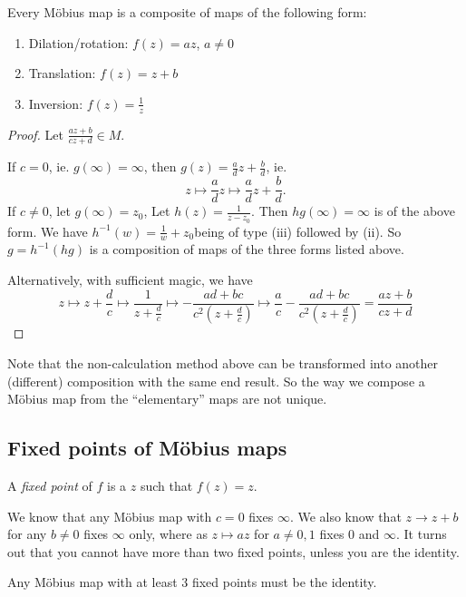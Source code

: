 \documentclass[a4paper]{article}
\begin{document}
\begin{prop}
  Every M\"obius map is a composite of maps of the following form:
  \begin{enumerate}
    \item Dilation/rotation: $f(z) = az$, $a\not= 0$
    \item Translation: $f(z) = z + b$
    \item Inversion: $f(z) = \frac{1}{z}$
  \end{enumerate}
\end{prop}
\begin{proof}
  Let $\frac{az + b}{cz + d}\in M$.

  If $c = 0$, ie. $g(\infty) = \infty$, then $g(z) = \frac{a}{d}z + \frac{b}{d}$, ie.
  \[
    z\mapsto \frac{a}{d} z\mapsto \frac{a}{d}z + \frac{b}{d}.
  \]
  If $c\not= 0$, let $g(\infty)=z_0$, Let $h(z) = \frac{1}{z - z_0}$. Then $hg(\infty) = \infty$ is of the above form. We have $h^{-1}(w) = \frac{1}{w} + z_0$being of type (iii) followed by (ii). So $g = h^{-1} (hg)$ is a composition of maps of the three forms listed above.

  Alternatively, with sufficient magic, we have
  \[
    z\mapsto z + \frac{d}{c} \mapsto \frac{1}{z + \frac{d}{c}} \mapsto -\frac{ad + bc}{c^2(z + \frac{d}{c})}\mapsto \frac{a}{c} -\frac{ad + bc}{c^2(z + \frac{d}{c})} = \frac{az + b}{cz + d}
  \]
\end{proof}
Note that the non-calculation method above can be transformed into another (different) composition with the same end result. So the way we compose a M\"obius map from the ``elementary'' maps are not unique.

\subsection{Fixed points of M\"obius maps}
\begin{defi}
  A \emph{fixed point} of $f$ is a $z$ such that $f(z) = z$.
\end{defi}

We know that any M\"obius map with $c = 0$ fixes $\infty$. We also know that $z\to z + b$ for any $b\not= 0$ fixes $\infty$ only, where as $z\mapsto az$ for $a\not= 0, 1$ fixes $0$ and $\infty$. It turns out that you cannot have more than two fixed points, unless you are the identity.

\begin{prop}
  Any M\"obius map with at least 3 fixed points must be the identity.
\end{prop}
\end{document}
